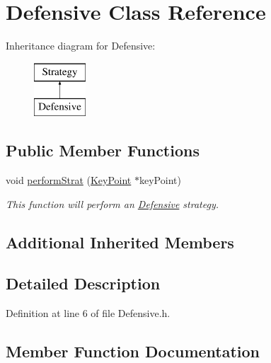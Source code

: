 \hypertarget{classDefensive}{}\section{Defensive Class Reference}
\label{classDefensive}
Inheritance diagram for Defensive\+:\begin{figure}[H]
\begin{center}
\leavevmode
\includegraphics[height=2.000000cm]{classDefensive}
\end{center}
\end{figure}
\subsection*{Public Member Functions}
\begin{DoxyCompactItemize}
\item 
void \hyperlink{classDefensive_ad824897b2075d2184612ab6efcdd8367}{perform\+Strat} (\hyperlink{classKeyPoint}{Key\+Point} $\ast$key\+Point)
\begin{DoxyCompactList}\small\item\em This function will perform an \hyperlink{classDefensive}{Defensive} strategy. \end{DoxyCompactList}\end{DoxyCompactItemize}
\subsection*{Additional Inherited Members}


\subsection{Detailed Description}


Definition at line 6 of file Defensive.\+h.



\subsection{Member Function Documentation}
\mbox{\label{classDefensive_ad824897b2075d2184612ab6efcdd8367}} 
